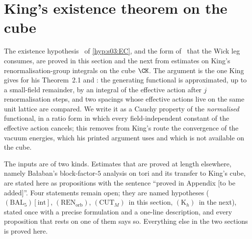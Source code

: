 \providecommand{\moving}[1]{\textcolor{orange!80!black}{[#1]}}
\providecommand{\Hrel}{\ensuremath{(\mathrm{H0rel})_{C}}}
\providecommand{\Kpos}{\ensuremath{(\mathrm{K}\text{-}\mathrm{pos})_{N}}}
\providecommand{\BALint}{\ensuremath{(\mathrm{BAL}_{5})[\mathrm{int}]}}
\providecommand{\RENorb}{\ensuremath{(\mathrm{REN}_{\mathrm{orb}})}}
\providecommand{\CUTM}{\ensuremath{(\mathrm{CUT}_{M})}}
\providecommand{\Kh}{\ensuremath{(\mathrm{K}_{h})}}
\providecommand{\Uplus}{\ensuremath{(\mathrm{U}^{+})}}
\providecommand{\Bh}{\ensuremath{(\mathrm{B}^{h})}}
\providecommand{\Rzero}{\ensuremath{(\mathrm{R}_{0})}}
\providecommand{\Wsh}[1]{\ensuremath{(\mathrm{W}^{\sharp})[#1]}}
\providecommand{\UBm}{\ensuremath{(\mathrm{UB}^{-})}}
\providecommand{\NEGinf}{\ensuremath{(\mathrm{NEG}_{\infty})}}
\providecommand{\Zk}{\ensuremath{Z_{k}}}
\providecommand{\Ik}[1]{\ensuremath{I^{(#1)}_{k}}}
\providecommand{\Ihat}[1]{\ensuremath{\hat I^{(#1)}_{k}}}

\section{King's existence theorem on the cube}\label{sec:k01}

The existence hypothesis \EC\ of \cref{hyp:s03:EC}, and the form of \Wone\ that the Wick leg consumes, are proved in this section and the next from estimates on King's renormalisation-group integrals on the cube $\CK$. The argument is the one King gives for his Theorem~2.1 \cite[Sect.~3.1]{K2} and \cite[Sect.~3.2]{K1}: the generating functional is approximated, up to a small-field remainder, by an integral of the effective action after $j$ renormalisation steps, and two spacings whose effective actions live on the same unit lattice are compared. We write it as a Cauchy property of the \emph{normalised} functional, in a ratio form in which every field-independent constant of the effective action cancels; this removes from King's route the convergence of the vacuum energies, which his printed argument uses and which is not available on the cube.

The inputs are of two kinds. Estimates that are proved at length elsewhere, namely Ba{\l}aban's block-factor-$5$ analysis \cite{Ba1,Ba2,Ba3,Ba4} on tori and its transfer to King's cube, are stated here as propositions with the sentence ``proved in Appendix [to be added]''. Four statements remain open; they are named hypotheses (\BALint, \RENorb, \CUTM\ in this section, \Kh\ in the next), stated once with a precise formulation and a one-line description, and every proposition that rests on one of them says so. Everything else in the two sections is proved here.

